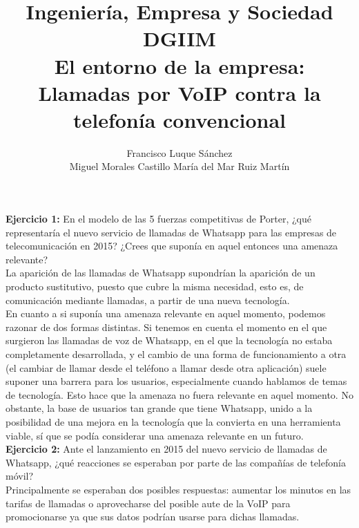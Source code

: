\documentclass[11pt]{article}
\theoremstyle{plain}
\theoremstyle{definition}
\begin{document}
\title{Ingeniería, Empresa y Sociedad \\
  DGIIM \\
  \large El entorno de la empresa: Llamadas por VoIP contra la
  telefonía convencional }
\author{Francisco Luque Sánchez\\
  Miguel Morales Castillo María del Mar Ruiz Martín}

\maketitle

\textbf{Ejercicio 1:} En el modelo de las 5 fuerzas competitivas de
Porter, ¿qué representaría el nuevo servicio de llamadas de Whatsapp
para las empresas de telecomunicación en 2015? ¿Crees que suponía en
aquel entonces una amenaza relevante?\\

La aparición de las llamadas de Whatsapp supondrían la aparición de
un producto sustitutivo, puesto que cubre la misma necesidad, esto es,
de comunicación mediante llamadas, a partir de una nueva tecnología.\\

En cuanto a si suponía una amenaza relevante en aquel momento, podemos
razonar de dos formas distintas. Si tenemos en cuenta el momento en el
que surgieron las llamadas de voz de Whatsapp, en el que la tecnología
no estaba completamente desarrollada, y el cambio de una forma de
funcionamiento a otra (el cambiar de llamar desde el teléfono a llamar
desde otra aplicación) suele suponer una barrera para los usuarios,
especialmente cuando hablamos de temas de tecnología. Esto hace que la
amenaza no fuera relevante en aquel momento. No obstante, la base de
usuarios tan grande que tiene Whatsapp, unido a la posibilidad de una
mejora en la tecnología que la convierta en una herramienta viable, sí
que se podía considerar una amenaza relevante en un futuro.\\

\textbf{Ejercicio 2:} Ante el lanzamiento en 2015 del nuevo servicio
de llamadas de Whatsapp, ¿qué reacciones se esperaban por parte de las
compañías de telefonía móvil?\\


Principalmente se esperaban dos posibles respuestas: aumentar los 
minutos en las tarifas de llamadas o aprovecharse del posible aute
de la VoIP para promocionarse ya que sus datos podrían usarse para
dichas llamadas.\\
\end{document}
